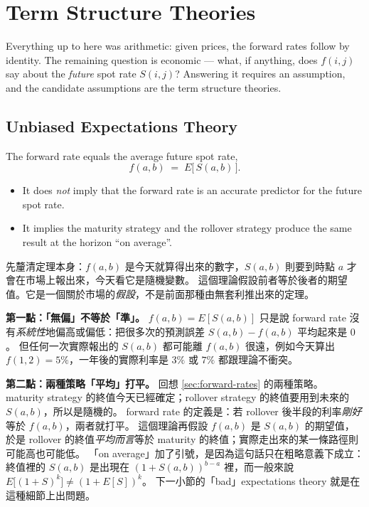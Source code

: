 \section{Term Structure Theories}
\label{sec:ts-theories}

Everything up to here was arithmetic: given prices, the forward rates follow by identity.
The remaining question is economic --- what, if anything, does $f(i,j)$ say about the \emph{future} spot rate $S(i,j)$?
Answering it requires an assumption, and the candidate assumptions are the term structure theories.

\subsection{Unbiased Expectations Theory}


\begin{theorem}
	The forward rate equals the average future spot rate,
	\begin{equation}
		f(a,b) \;=\; E\bigl[\,S(a,b)\,\bigr] . \label{eq:uet}
	\end{equation}
\end{theorem}

\begin{itemize}[nosep]
	\item It does \emph{not} imply that the forward rate is an accurate predictor for the future spot rate.
	\item It implies the maturity strategy and the rollover strategy produce the same result at the horizon ``on average''.
\end{itemize}

\suppstart
\begin{remark}
	先釐清定理本身：$f(a,b)$ 是今天就算得出來的數字，$S(a,b)$ 則要到時點 $a$ 才會在市場上報出來，今天看它是隨機變數。
	這個理論假設前者等於後者的期望值。它是一個關於市場的\emph{假設}，不是前面那種由無套利推出來的定理。

	\textbf{第一點：「無偏」不等於「準」。}
	$f(a,b)=E[S(a,b)]$ 只是說 forward rate 沒有\emph{系統性}地偏高或偏低：把很多次的預測誤差 $S(a,b)-f(a,b)$ 平均起來是 $0$。
	但任何一次實際報出的 $S(a,b)$ 都可能離 $f(a,b)$ 很遠，例如今天算出 $f(1,2)=5\%$，一年後的實際利率是 $3\%$ 或 $7\%$ 都跟理論不衝突。

	\textbf{第二點：兩種策略「平均」打平。}
	回想 \autoref{sec:forward-rates} 的兩種策略。
	maturity strategy 的終值今天已經確定；rollover strategy 的終值要用到未來的 $S(a,b)$，所以是隨機的。
	forward rate 的定義是：若 rollover 後半段的利率\emph{剛好}等於 $f(a,b)$，兩者就打平。
	這個理論再假設 $f(a,b)$ 是 $S(a,b)$ 的期望值，於是 rollover 的終值\emph{平均而言}等於 maturity 的終值；實際走出來的某一條路徑則可能高也可能低。
	「on average」加了引號，是因為這句話只在粗略意義下成立：終值裡的 $S(a,b)$ 是出現在 $(1+S(a,b))^{b-a}$ 裡，而一般來說 $E\bigl[(1+S)^{k}\bigr]\ne(1+E[S])^{k}$。
	下一小節的「bad」expectations theory 就是在這種細節上出問題。
\end{remark}
\suppend

